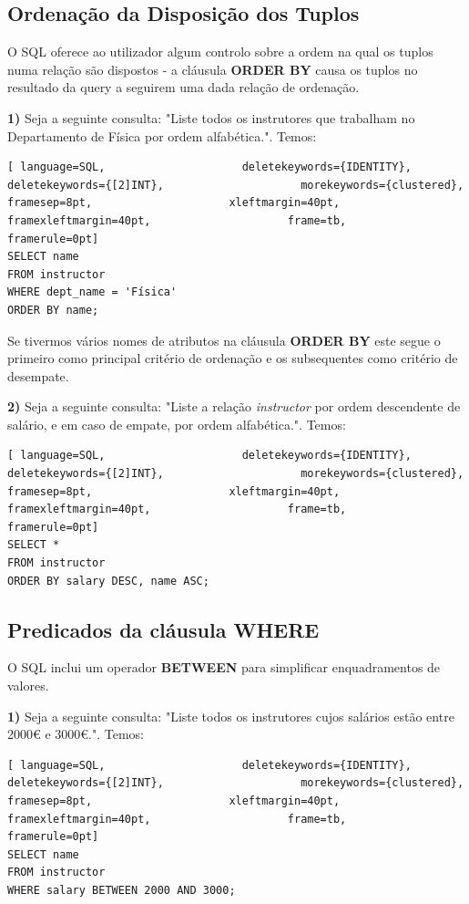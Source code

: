 \documentclass[titlepage]{book}
\theoremstyle{definition}
\begin{document}
\subsection{Ordenação da Disposição dos Tuplos}
O SQL oferece ao utilizador algum controlo sobre a ordem na qual os tuplos numa relação são dispostos - a cláusula \textbf{ORDER BY} causa os tuplos no resultado da query a seguirem uma dada relação de ordenação. 

\textbf{1)} Seja a seguinte consulta: "Liste todos os instrutores que trabalham no Departamento de Física por ordem alfabética.". Temos:
\begin{lstlisting}[ language=SQL,                     deletekeywords={IDENTITY},                     deletekeywords={[2]INT},                     morekeywords={clustered},                     framesep=8pt,                     xleftmargin=40pt,                     framexleftmargin=40pt,                     frame=tb,                     framerule=0pt]
SELECT name
FROM instructor
WHERE dept_name = 'Física'
ORDER BY name;
\end{lstlisting}

Se tivermos vários nomes de atributos na cláusula \textbf{ORDER BY} este segue o primeiro como principal critério de ordenação e os subsequentes como critério de desempate.

\textbf{2)} Seja a seguinte consulta: "Liste a relação \textit{instructor} por ordem descendente de salário, e em caso de empate, por ordem alfabética.". Temos:
\begin{lstlisting}[ language=SQL,                     deletekeywords={IDENTITY},                     deletekeywords={[2]INT},                     morekeywords={clustered},                     framesep=8pt,                     xleftmargin=40pt,                     framexleftmargin=40pt,                     frame=tb,                     framerule=0pt]
SELECT *
FROM instructor
ORDER BY salary DESC, name ASC;
\end{lstlisting}

\subsection{Predicados da cláusula WHERE}
O SQL inclui um operador \textbf{BETWEEN} para simplificar enquadramentos de valores.

\textbf{1)} Seja a seguinte consulta: "Liste todos os instrutores cujos salários estão entre 2000€ e 3000€.". Temos:
\begin{lstlisting}[ language=SQL,                     deletekeywords={IDENTITY},                     deletekeywords={[2]INT},                     morekeywords={clustered},                     framesep=8pt,                     xleftmargin=40pt,                     framexleftmargin=40pt,                     frame=tb,                     framerule=0pt]
SELECT name
FROM instructor
WHERE salary BETWEEN 2000 AND 3000;
\end{lstlisting}
\end{document}
